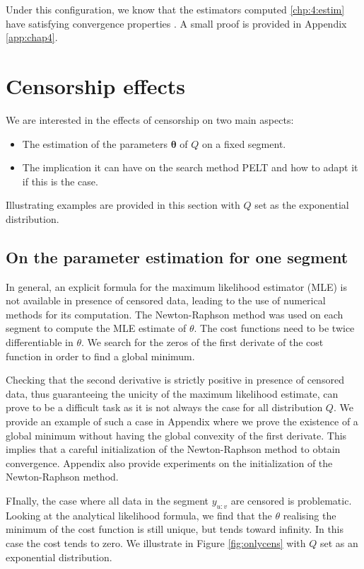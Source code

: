 Under this configuration, we know that the estimators computed \ref{chp:4:estim} have satisfying convergence properties \citep{Lavielle1997}. A small proof is provided in Appendix \ref{app:chap4}.

\section{Censorship effects}\label{chp:4:2}

We are interested in the effects of censorship on two main aspects: 
\begin{itemize}
\item The estimation of the parameters $\bm \theta$ of $Q$ on a fixed segment. 
\item The implication it can have on the search method PELT and how to adapt it if this is the case. 
\end{itemize} 
Illustrating examples are provided in this section with $Q$ set as the exponential distribution.

\subsection{On the parameter estimation for one segment}

In general, an explicit formula for the maximum likelihood estimator (MLE) is not available in presence of censored data, leading to the use of numerical methods for its computation. The Newton-Raphson method was used on each segment to compute the MLE estimate of $\theta$. The cost functions need to be twice differentiable in $\theta$. We search for the zeros of the first derivate of the cost function in order to find a global minimum. 

Checking that the second derivative is strictly positive in presence of censored data, thus guaranteeing the unicity of the maximum likelihood estimate, can prove to be a difficult task as it is not always the case for all distribution $Q$. We provide an example of such a case in Appendix where we prove the existence of a global minimum without having the global convexity of the first derivate. This implies that a careful initialization of the Newton-Raphson method to obtain convergence. Appendix also provide experiments on the initialization of the Newton-Raphson method. 

FInally, the case where all data in the segment $y_{u:v}$ are censored is problematic. Looking at the analytical likelihood formula, we find that the $\theta$ realising the minimum of the cost function is still unique, but tends toward infinity. In this case the cost tends to zero. We illustrate in Figure \ref{fig:onlycens} with $Q$ set as an exponential distribution. 

